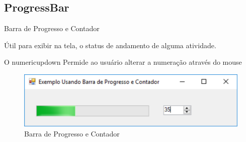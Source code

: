 \subsection{ProgressBar}

\begin{frame}

	\begin{CaixaModelo01}{Barra de Progresso e Contador}

		Útil para exibir na tela, o status de andamento de alguma atividade.
		
		O numericupdown Permide ao usuário alterar a numeração através do mouse

		\begin{figure}
			\includegraphics[scale=.45]{./Figuras/F07_BarraProgressoContador.png}
			\caption{Barra de Progresso e Contador}
			\label{fig:BarraProgressoContador}
		\end{figure}
	
	\end{CaixaModelo01}

\end{frame}